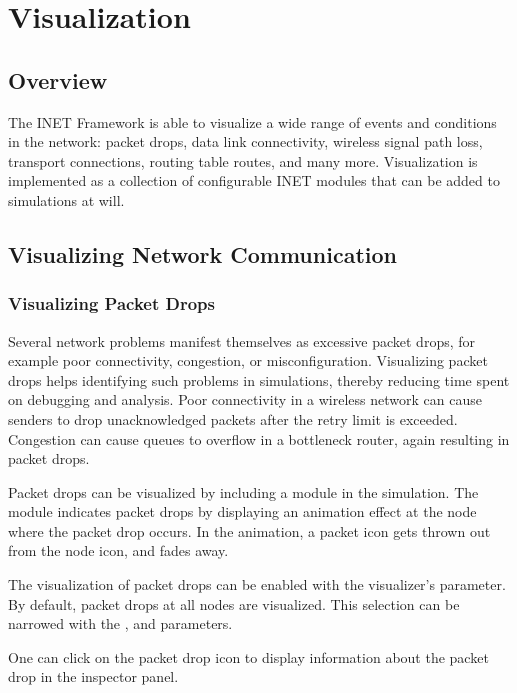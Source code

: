 \chapter{Visualization}
\label{cha:visualization}

\section{Overview}

The INET Framework is able to visualize a wide range of events and conditions
in the network: packet drops, data link connectivity, wireless signal path loss,
transport connections, routing table routes, and many more. Visualization is
implemented as a collection of configurable INET modules that can be added
to simulations at will.

\section{Visualizing Network Communication}

\subsection{Visualizing Packet Drops}

Several network problems manifest themselves as excessive packet drops, for
example poor connectivity, congestion, or misconfiguration. Visualizing packet
drops helps identifying such problems in simulations, thereby reducing time
spent on debugging and analysis. Poor connectivity in a wireless network can
cause senders to drop unacknowledged packets after the retry limit is exceeded.
Congestion can cause queues to overflow in a bottleneck router, again resulting
in packet drops.

Packet drops can be visualized by including a 
module in the simulation. The  module indicates
packet drops by displaying an animation effect at the node where the packet drop
occurs. In the animation, a packet icon gets thrown out from the node icon, and
fades away.

The visualization of packet drops can be enabled with the visualizer's
 parameter. By default, packet drops at all nodes are
visualized. This selection can be narrowed with the ,
 and  parameters.

One can click on the packet drop icon to display information about the packet
drop in the inspector panel.

